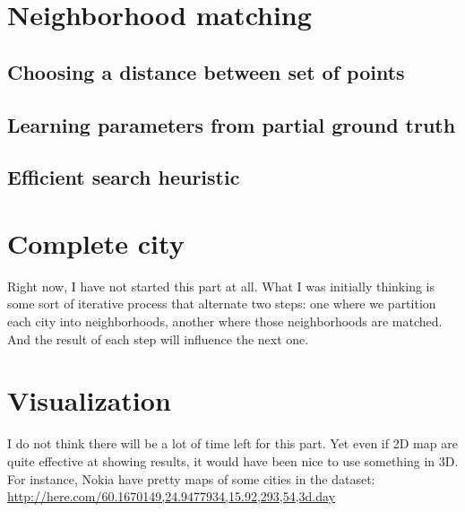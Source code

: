 \section{Neighborhood matching}

\subsection{Choosing a distance between set of points}
\subsection{Learning parameters from partial ground truth}
\subsection{Efficient search heuristic}

\section{Complete city}

\begin{comments}
Right now, I have not started this part at all. What I was initially thinking
is some sort of iterative process that alternate two steps: one where we
partition each city into neighborhoods, another where those neighborhoods are
matched. And the result of each step will influence the next one.
\end{comments}

\section{Visualization}
\begin{comments}
I do not think there will be a lot of time left for this part. Yet even if 2D
map are quite effective at showing results, it would have been nice to use
something in 3D. For instance, Nokia have pretty maps of some cities in the
dataset: \href{http://here.com/60.1670149,24.9477934,15.92,293,54,3d.day}%
{\url{http://here.com/60.1670149,24.9477934,15.92,293,54,3d.day}}
\end{comments}
